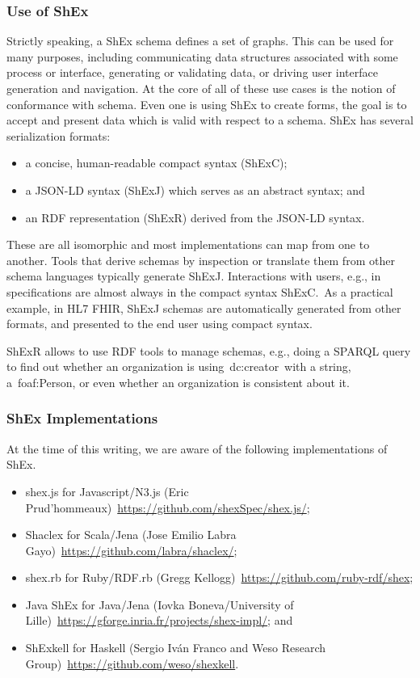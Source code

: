 \subsubsection{Use of ShEx}
Strictly speaking, a ShEx schema defines a set of graphs. This can be used for many purposes, including
communicating data structures associated with some process or interface, generating or validating data,
or driving user interface generation and navigation. At the core of all of these use cases is the notion
of conformance with schema. Even one is using ShEx to create forms, the goal is to accept and present
data which is valid with respect to a schema. ShEx has several serialization formats:

\begin{itemize}
	\item a concise, human-readable compact syntax (ShExC);
	\item a JSON-LD syntax (ShExJ) which serves as an abstract syntax; and
	\item an RDF representation (ShExR) derived from the JSON-LD syntax.
\end{itemize}

These are all isomorphic and most implementations can map from one to another.
Tools that derive schemas by inspection or translate them from other schema languages typically generate ShExJ.
Interactions with users, e.g., in specifications are almost always in the compact syntax ShExC. As a practical
example, in HL7 FHIR, ShExJ schemas are automatically generated from other formats, and presented to the end
user using compact syntax.

ShExR allows to use RDF tools to manage schemas, e.g., doing a SPARQL query to find out whether an organization
is using dc:creator with a string, a foaf:Person, or even whether an organization is consistent about it.

\subsubsection{ShEx Implementations} 
At the time of this writing, we are aware of the following implementations of ShEx.

\begin{itemize}
	\item shex.js for Javascript/N3.js (Eric Prud’hommeaux) \url{https://github.com/shexSpec/shex.js/};
	\item Shaclex for Scala/Jena (Jose Emilio Labra Gayo) \url{https://github.com/labra/shaclex/};
	\item shex.rb for Ruby/RDF.rb (Gregg Kellogg) \url{https://github.com/ruby-rdf/shex};
	\item Java ShEx for Java/Jena (Iovka Boneva/University of Lille) \url{https://gforge.inria.fr/projects/shex-impl/}; and
	\item ShExkell for Haskell (Sergio Iván Franco and Weso Research Group) \url{https://github.com/weso/shexkell}.
\end{itemize}

